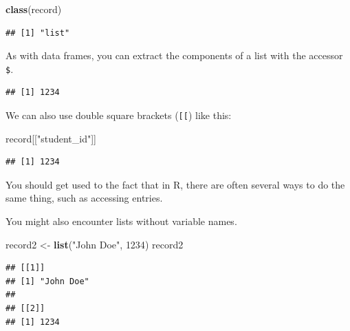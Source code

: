 \documentclass[
]{article}
\newenvironment{Shaded}{\begin{snugshade}}{\end{snugshade}}
\newcommand{\DecValTok}[1]{\textcolor[rgb]{0.00,0.00,0.81}{#1}}
\newcommand{\FunctionTok}[1]{\textcolor[rgb]{0.13,0.29,0.53}{\textbf{#1}}}
\newcommand{\NormalTok}[1]{#1}
\newcommand{\OtherTok}[1]{\textcolor[rgb]{0.56,0.35,0.01}{#1}}
\newcommand{\SpecialCharTok}[1]{\textcolor[rgb]{0.81,0.36,0.00}{\textbf{#1}}}
\newcommand{\StringTok}[1]{\textcolor[rgb]{0.31,0.60,0.02}{#1}}
\begin{document}
\begin{Shaded}
\begin{Highlighting}[]
\FunctionTok{class}\NormalTok{(record)}
\end{Highlighting}
\end{Shaded}

\begin{verbatim}
## [1] "list"
\end{verbatim}

As with data frames, you can extract the components of a list with the
accessor \texttt{\$}.

\begin{Shaded}
\end{Shaded}

\begin{verbatim}
## [1] 1234
\end{verbatim}

We can also use double square brackets (\texttt{{[}{[}}) like this:

\begin{Shaded}
\begin{Highlighting}[]
\NormalTok{record[[}\StringTok{"student\_id"}\NormalTok{]]}
\end{Highlighting}
\end{Shaded}

\begin{verbatim}
## [1] 1234
\end{verbatim}

You should get used to the fact that in R, there are often several ways
to do the same thing, such as accessing entries.

You might also encounter lists without variable names.

\begin{Shaded}
\begin{Highlighting}[]
\NormalTok{record2 }\OtherTok{\textless{}{-}} \FunctionTok{list}\NormalTok{(}\StringTok{"John Doe"}\NormalTok{, }\DecValTok{1234}\NormalTok{)}
\NormalTok{record2}
\end{Highlighting}
\end{Shaded}

\begin{verbatim}
## [[1]]
## [1] "John Doe"
## 
## [[2]]
## [1] 1234
\end{verbatim}
\end{document}
